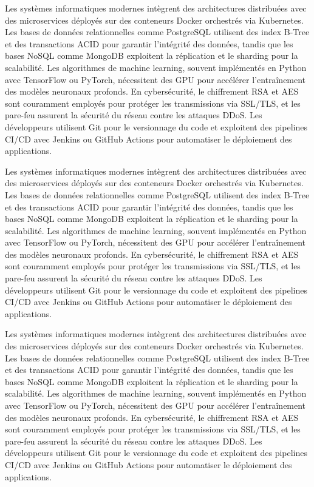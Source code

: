 Les systèmes informatiques modernes intègrent des architectures distribuées avec des microservices déployés sur des conteneurs Docker orchestrés via Kubernetes. Les bases de données relationnelles comme PostgreSQL utilisent des index B-Tree et des transactions ACID pour garantir l'intégrité des données, tandis que les bases NoSQL comme MongoDB exploitent la réplication et le sharding pour la scalabilité. Les algorithmes de machine learning, souvent implémentés en Python avec TensorFlow ou PyTorch, nécessitent des GPU pour accélérer l'entraînement des modèles neuronaux profonds. En cybersécurité, le chiffrement RSA et AES sont couramment employés pour protéger les transmissions via SSL/TLS, et les pare-feu assurent la sécurité du réseau contre les attaques DDoS. Les développeurs utilisent Git pour le versionnage du code et exploitent des pipelines CI/CD avec Jenkins ou GitHub Actions pour automatiser le déploiement des applications.

Les systèmes informatiques modernes intègrent des architectures distribuées avec des microservices déployés sur des conteneurs Docker orchestrés via Kubernetes. Les bases de données relationnelles comme PostgreSQL utilisent des index B-Tree et des transactions ACID pour garantir l'intégrité des données, tandis que les bases NoSQL comme MongoDB exploitent la réplication et le sharding pour la scalabilité. Les algorithmes de machine learning, souvent implémentés en Python avec TensorFlow ou PyTorch, nécessitent des GPU pour accélérer l'entraînement des modèles neuronaux profonds. En cybersécurité, le chiffrement RSA et AES sont couramment employés pour protéger les transmissions via SSL/TLS, et les pare-feu assurent la sécurité du réseau contre les attaques DDoS. Les développeurs utilisent Git pour le versionnage du code et exploitent des pipelines CI/CD avec Jenkins ou GitHub Actions pour automatiser le déploiement des applications.

Les systèmes informatiques modernes intègrent des architectures distribuées avec des microservices déployés sur des conteneurs Docker orchestrés via Kubernetes. Les bases de données relationnelles comme PostgreSQL utilisent des index B-Tree et des transactions ACID pour garantir l'intégrité des données, tandis que les bases NoSQL comme MongoDB exploitent la réplication et le sharding pour la scalabilité. Les algorithmes de machine learning, souvent implémentés en Python avec TensorFlow ou PyTorch, nécessitent des GPU pour accélérer l'entraînement des modèles neuronaux profonds. En cybersécurité, le chiffrement RSA et AES sont couramment employés pour protéger les transmissions via SSL/TLS, et les pare-feu assurent la sécurité du réseau contre les attaques DDoS. Les développeurs utilisent Git pour le versionnage du code et exploitent des pipelines CI/CD avec Jenkins ou GitHub Actions pour automatiser le déploiement des applications.
